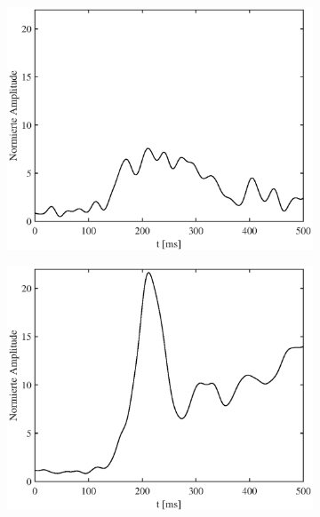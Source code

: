 \documentclass[doc,a4paper,12pt]{apa6}
\begin{document}
\begin{figure}
\begin{subfigure}[c]{0.47\textwidth}
    \label{img:pa07:zeit:raw-mne}
  \end{subfigure}\vspace*{0.04\textwidth}
  \begin{subfigure}[c]{0.47\textwidth}
    \includegraphics[width=\textwidth]{ergebnisse/timecourse/pa07_eve2_sss_lcmv_timecourse_right.eps}
    \label{img:pa07:zeit:sss-lcmv}
  \end{subfigure}\hspace*{0.04\textwidth}
  \begin{subfigure}[c]{0.47\textwidth}
    \includegraphics[width=\textwidth]{ergebnisse/timecourse/pa07_eve2_sss_mne_timecourse_right.eps}

\end{subfigure}
\end{figure}
\end{document}
